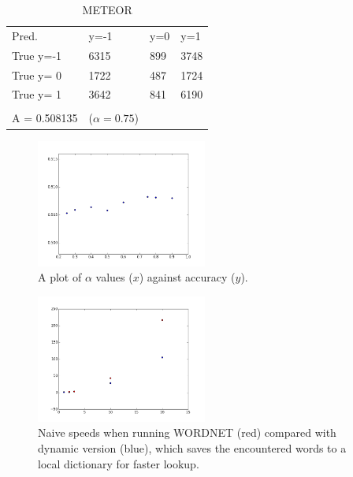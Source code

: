 \documentclass{article}
\begin{document}
\begin{table}[tbp]
\centering
\caption{METEOR}
\label{t2}
\begin{tabular}{llll}
Pred.               & y=-1 & y=0 & y=1  \\
True y=-1           & 6315 & 899 & 3748 \\
True y= 0           & 1722 & 487 & 1724 \\
True y= 1           & 3642 & 841 & 6190 \\
                    &      &     &      \\
A = 0.508135 & ($\alpha=0.75$)     &     &
\end{tabular}
\end{table}

\begin{figure}[ht]
\caption{A plot of $\alpha$ values ($x$) against accuracy ($y$).}
\label{fig:meteoralpha}
\centering
\includegraphics[width=0.5\textwidth]{figure_1}
\end{figure}

\begin{figure}[ht]
\caption{Naive speeds when running WORDNET (red) compared with dynamic version (blue), which saves the encountered words to a local dictionary for faster lookup.}
\label{fig:dynamic}
\centering
\includegraphics[width=0.5\textwidth]{figure_2}
\end{figure}
\end{document}
